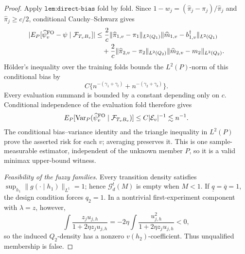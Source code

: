 \documentclass{article}
\begin{document}
\begin{proof}
Apply \(\texttt{lem:direct-bias}\) fold by fold. Since \(1-w_j=(\widehat\pi_j-\pi_j)/\widehat\pi_j\) and \(\widehat\pi_j\ge c/2\), conditional Cauchy--Schwarz gives
\[\begin{aligned}|E_P[\widehat\psi_v^{\rm FO}-\psi\mid\mathcal F_{T_vB_v}]|&\le\frac2c\|\widehat\pi_{1,v}-\pi_1\|_{L^2(Q_1)}\|\widehat m_{1,v}-b_{1,v}^\dagger\|_{L^2(Q_1)}\\&\quad+\frac2c\|\widehat\pi_{2,v}-\pi_2\|_{L^2(Q_2)}\|\widehat m_{2,v}-m_2\|_{L^2(Q_2)}.\end{aligned}\]
H\"older's inequality over the training folds bounds the \(L^2(P)\)-norm of this conditional bias by
\[C\{n^{-(\gamma_1+\gamma_t)}+n^{-(\gamma_2+\gamma_b)}\}.\]
Every evaluation summand is bounded by a constant depending only on \(c\). Conditional independence of the evaluation fold therefore gives
\[E_P[\operatorname{Var}_P(\widehat\psi_v^{\rm FO}\mid\mathcal F_{T_vB_v})]\le C|\mathcal E_v|^{-1}\lesssim n^{-1}.\]
The conditional bias--variance identity and the triangle inequality in \(L^2(P)\) prove the asserted risk for each \(v\); averaging preserves it. This is one sample-measurable estimator, independent of the unknown member \(P\), so it is a valid minimax upper-bound witness.

\emph{Feasibility of the fuzzy families.} Every transition density satisfies \(\sup_{h_1}\|g(\cdot\mid h_1)\|_{L^1}=1\); hence \(\mathcal G_d^t(M)\) is empty when \(M<1\). If \(\underline q=\overline q=1\), the design condition forces \(q_2=1\). In a nontrivial first-experiment component with \(\lambda=z\), however,
\[\int\frac{z_ju_{j,h}}{1+2\eta z_ju_{j,h}}=-2\eta\int\frac{u_{j,h}^2}{1+2\eta z_ju_{j,h}}<0,\]
so the induced \(Q_2\)-density has a nonzero \(v(h_2)\)-coefficient. Thus unqualified membership is false.


\end{proof}
\end{document}
